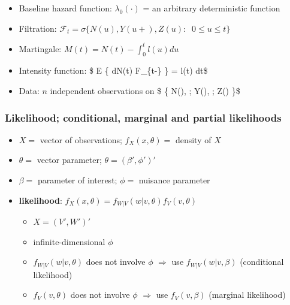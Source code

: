 \documentclass[
]{book}
\providecommand{\tightlist}{%
  \setlength{\itemsep}{0pt}\setlength{\parskip}{0pt}}
\begin{document}
{{{\begin{itemize}
  \begin{itemize}
  \tightlist
  \item
    time-dependent treatment, risk factors
  \item
    model checking and relaxing PH assumption
  \end{itemize}
\item
  Baseline hazard function: \(\lambda_0(\cdot)\) = an arbitrary deterministic function
\item
  Filtration: \(\mathcal F_t = \sigma \Big \{ N(u) , Y(u+) , Z(u): \; \; 0 \le u \le t \Big \}\)
\item
  Martingale: \(M(t) = N(t) - \int_0^t l(u) du\)
\item
  Intensity function: \$ E \Big \{ dN(t) \Big \textbar{} \mathcal F\_\{t-\} \Big\} = l(t) dt\$
\item
  Data: \(n\) independent observations on \$ \Big \{ N(\cdot), ; Y(\cdot), ; Z(\cdot) \Big \}\$
\end{itemize}

\hypertarget{likelihood-conditional-marginal-and-partial-likelihoods}{%
\subsubsection{Likelihood; conditional, marginal and partial likelihoods}\label{likelihood-conditional-marginal-and-partial-likelihoods}}

\begin{itemize}
\item
  \(X =\) vector of observations; \(f_X(x, \theta) =\) density of \(X\)
\item
  \(\theta =\) vector parameter; \(\theta = (\beta ' , \phi')'\)
\item
  \(\beta =\) parameter of interest; \(\phi =\) nuisance parameter
\item
  \textbf{likelihood}: \(f_X(x, \theta) = f_{W|V} (w \Big | v, \theta )f_V (v, \theta)\)

  \begin{itemize}
  \tightlist
  \item
    \(X = (V', W')'\)
  \item
    infinite-dimensional \(\phi\)
  \item
    \(f_{W|V} (w \Big | v, \theta )\) does not involve \(\phi\) \(\Rightarrow\) use \(f_{W|V} (w \Big | v, \beta )\) (conditional likelihood)
  \item
    \(f_V (v, \theta)\) does not involve \(\phi\) \(\Rightarrow\) use \(f_V (v, \beta)\) (marginal likelihood)
  \end{itemize}
\end{itemize}

}}}
\end{document}
